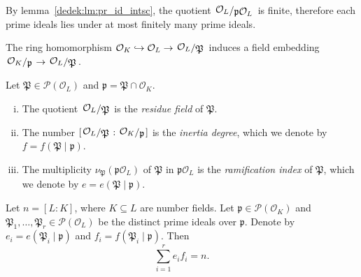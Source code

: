 \begin{opomba}
By lemma~\ref{dedek:lm:pr_id_intsc}, the quotient
$\kvoc{\mathcal{O}_L}{\mathfrak{p} \mathcal{O}_L}$ is finite,
therefore each prime ideals lies under at most finitely many prime
ideals.
\end{opomba}

\begin{opomba}
The ring homomorphism
$\mathcal{O}_K \hookrightarrow
\mathcal{O}_L \to
\kvoc{\mathcal{O}_L}{\mathfrak{P}}$
induces a field embedding
$\kvoc{\mathcal{O}_K}{\mathfrak{p}} \to
\kvoc{\mathcal{O}_L}{\mathfrak{P}}$.
\end{opomba}

\begin{definicija}
Let $\mathfrak{P} \in \mathcal{P}(\mathcal{O}_L)$ and
$\mathfrak{p} = \mathfrak{P} \cap \mathcal{O}_K$.

\begin{enumerate}[i)]
\item The quotient $\kvoc{\mathcal{O}_L}{\mathfrak{P}}$ is the
\emph{residue field} of $\mathfrak{P}$.
\item The number
$\left[\kvoc{\mathcal{O}_L}{\mathfrak{P}} :
\kvoc{\mathcal{O}_K}{\mathfrak{p}}\right]$
is the \emph{inertia degree}, which we denote
by $f = f(\mathfrak{P} \mid \mathfrak{p})$.
\item The multiplicity
$\nu_{\mathfrak{P}}(\mathfrak{p} \mathcal{O}_L)$ of $\mathfrak{P}$
in $\mathfrak{p} \mathcal{O}_L$ is the
\emph{ramification index} of
$\mathfrak{P}$, which we denote by
$e = e(\mathfrak{P} \mid \mathfrak{p})$.
\end{enumerate}
\end{definicija}

\begin{izrek}
Let $n = [L : K]$, where $K \subseteq L$ are number fields. Let
$\mathfrak{p} \in \mathcal{P}(\mathcal{O}_K)$ and
$\mathfrak{P}_1, \dots, \mathfrak{P}_r \in
\mathcal{P}(\mathcal{O}_L)$ be the distinct prime ideals over
$\mathfrak{p}$. Denote by
$e_i = e(\mathfrak{P}_i \mid \mathfrak{p})$ and
$f_i = f(\mathfrak{P}_i \mid \mathfrak{p})$. Then
\[
\sum_{i=1}^r e_i f_i = n.
\]
\end{izrek}

